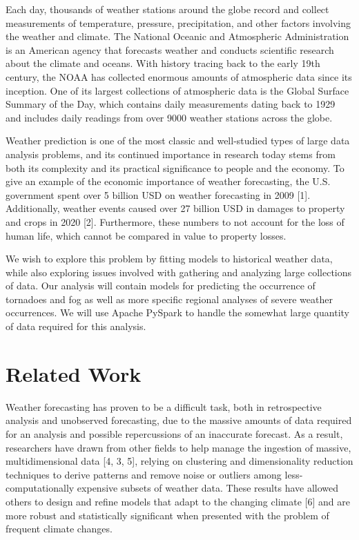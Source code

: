\documentclass[conference]{IEEEtran}
\begin{document}
Each day, thousands of weather stations around the globe record and collect measurements of temperature, pressure, precipitation, and other factors involving the weather and climate. The National Oceanic and Atmospheric Administration is an American agency that forecasts weather and conducts scientific research about the climate and oceans. With history tracing back to the early 19th century, the NOAA has collected enormous amounts of atmospheric data since its inception. One of its largest collections of atmospheric data is the Global Surface Summary of the Day, which contains daily measurements dating back to 1929 and includes daily readings from over 9000 weather stations across the globe.

Weather prediction is one of the most classic and well-studied types of large data analysis problems, and its continued importance in research today stems from both its complexity
and its practical significance to people and the economy. To give an example of the economic importance of weather forecasting, the U.S. government spent over 5 billion USD on weather forecasting in 2009 [1]. Additionally, weather events caused over 27 billion USD in damages to property and crops in 2020 [2]. Furthermore, these numbers to not account for the loss of human life, which cannot be compared in value to property losses.

We wish to explore this problem by fitting models to historical weather data, while also exploring issues involved with gathering and analyzing large collections of data. Our analysis will contain models for predicting the occurrence of tornadoes and fog as well as more specific regional analyses of severe weather occurrences. We will use Apache PySpark to handle the somewhat large quantity of data required for this analysis.

\section{Related Work}

Weather forecasting has proven to be a difficult task, both in retrospective analysis and unobserved forecasting, due to the massive amounts of data required for an analysis and possible repercussions of an inaccurate forecast. As a result, researchers have drawn from other fields to help manage the ingestion of massive, multidimensional data [4, 3, 5], relying on clustering and dimensionality reduction techniques to derive patterns and remove noise or outliers among less-computationally expensive subsets of weather data. These results have allowed others to design and refine models that adapt to the changing climate [6] and are more robust and statistically significant when presented with the problem of frequent climate changes.
\end{document}

